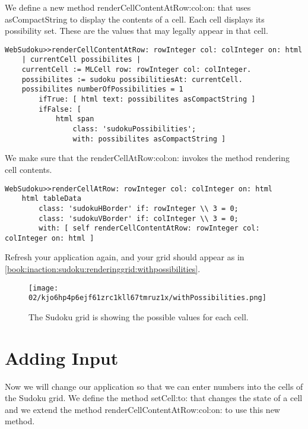 \documentclass[a4paper,10pt,twoside]{book}
\newcommand{\ct}[1]{{\small\ttfamily\textup{#1}}}
\begin{document}
We define a new method \ct{renderCellContentAtRow:col:on:} that uses \ct{asCompactString} to display the contents of a cell. Each cell displays its possibility set. These are the values that may legally appear in that cell.

\begin{lstlisting}
WebSudoku>>renderCellContentAtRow: rowInteger col: colInteger on: html
    | currentCell possibilites |
    currentCell := MLCell row: rowInteger col: colInteger.
    possibilites := sudoku possibilitiesAt: currentCell.
    possibilites numberOfPossibilities = 1
        ifTrue: [ html text: possibilites asCompactString ]
        ifFalse: [ 
            html span 
                class: 'sudokuPossibilities';
                with: possibilites asCompactString ]
\end{lstlisting}

We make sure that the \ct{renderCellAtRow:col:on:} invokes the method rendering cell contents.

\begin{lstlisting}
WebSudoku>>renderCellAtRow: rowInteger col: colInteger on: html
    html tableData
        class: 'sudokuHBorder' if: rowInteger \\ 3 = 0;
        class: 'sudokuVBorder' if: colInteger \\ 3 = 0;
        with: [ self renderCellContentAtRow: rowInteger col: colInteger on: html ]
\end{lstlisting}

Refresh your application again, and your grid should appear as in \autoref{book:inaction:sudoku:renderinggrid:withpossibilities}.

\begin{figure}[h!tbp]
	\begin{center}
		\texttt{[image: 02/kjo6hp4p6ejf61zrc1kll67tmruz1x/withPossibilities.png]}
		\caption{The Sudoku grid is showing the possible values for each cell.\label{book:inaction:sudoku:renderinggrid:withpossibilities}}
	\end{center}
\end{figure}


\section{Adding Input}
\label{book:inaction:sudoku:addinginput}

Now we will change our application so that we can enter numbers into the cells of the Sudoku grid. We define the method \ct{setCell:to:} that changes the state of a cell and we extend the method \ct{renderCellContentAtRow:col:on:} to use this new method.
\end{document}
